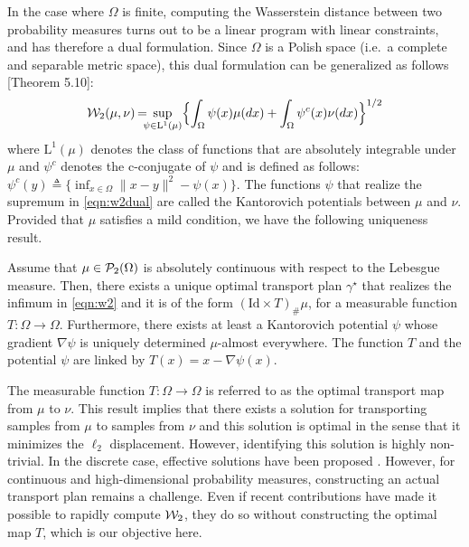 In the case where $\Omega$ is finite, computing the Wasserstein distance between two probability measures turns out to be  a linear program with linear constraints, and has therefore a dual formulation. Since $\Omega$ is a Polish space (i.e.\ a complete and separable metric space), this dual formulation can be generalized as follows \cite{villani2008optimal}[Theorem 5.10]:
\begin{align}
{\cal W}_2(\mu,\nu) \hspace{-1pt} = \hspace{-6pt} \sup_{\psi \in \mathrm{L}^1(\mu)} \Bigl\{ \int_\Omega \psi(x) \mu(dx) + \int_\Omega \psi^c(x) \nu(dx) \Bigr\}^{1/2} \label{eqn:w2dual}
\end{align}
where $\mathrm{L}^1(\mu)$ denotes the class of functions that are absolutely integrable under $\mu$ and $\psi^c$ denotes the c-conjugate of $\psi$ and is defined as follows: $\psi^c(y) \triangleq \{ \inf_{x\in \Omega} \| x-y\|^2 - \psi(x)\}$. The functions $\psi$ that realize the supremum in \eqref{eqn:w2dual} are called the Kantorovich potentials between $\mu$ and $\nu$.
%
Provided that $\mu$ satisfies a mild condition, we have the following  uniqueness result.
\begin{thm}
\label{thm:unqmap}
Assume that  $\mu\in {\cal P}_2(\Omega)$ is absolutely continuous with respect to the Lebesgue measure. Then, there exists a unique optimal transport plan $\gamma^\star$ that realizes the infimum in \eqref{eqn:w2} and it is of the form $(\text{Id} \times T)_\# \mu$, for a measurable function $T : \Omega \to \Omega$. Furthermore, there exists at least a Kantorovich potential $\psi$ whose gradient $\nabla \psi$ is uniquely determined $\mu$-almost everywhere. The function $T$ and the potential $\psi$ are linked by $T(x) = x- \nabla \psi(x)$.
\end{thm}
The measurable function $T : \Omega \to \Omega$ is referred to as the optimal transport map from $\mu$ to $\nu$.
This result implies that there exists a solution for transporting samples from $\mu$ to samples from $\nu$ and this solution is optimal in the sense that it minimizes the $\ell_2$ displacement. However, identifying this solution is highly non-trivial. In the discrete case, effective solutions have been proposed \cite{cuturi2013sinkhorn}. However, for continuous and high-dimensional probability measures, constructing an actual transport plan remains a challenge. Even if recent contributions \cite{genevay2016stochastic} have made it possible to rapidly compute ${\cal W}_2$, they do so without constructing the optimal map $T$, which is our objective here.


